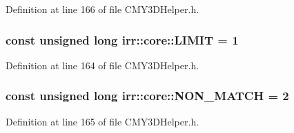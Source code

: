 Definition at line 166 of file C\-M\-Y3\-D\-Helper.\-h.

\hypertarget{namespaceirr_1_1core_ac8c28ea1e11eb1ac7a51ef47816e1797}{
\subsubsection[{L\-I\-M\-I\-T}]{\setlength{\rightskip}{0pt plus 5cm}const unsigned long irr\-::core\-::\-L\-I\-M\-I\-T = 1}}\label{namespaceirr_1_1core_ac8c28ea1e11eb1ac7a51ef47816e1797}


Definition at line 164 of file C\-M\-Y3\-D\-Helper.\-h.

\hypertarget{namespaceirr_1_1core_a0cb583561896e04ab6da7f6dcbae81f9}{
\subsubsection[{N\-O\-N\-\_\-\-M\-A\-T\-C\-H}]{\setlength{\rightskip}{0pt plus 5cm}const unsigned long irr\-::core\-::\-N\-O\-N\-\_\-\-M\-A\-T\-C\-H = 2}}\label{namespaceirr_1_1core_a0cb583561896e04ab6da7f6dcbae81f9}


Definition at line 165 of file C\-M\-Y3\-D\-Helper.\-h.


